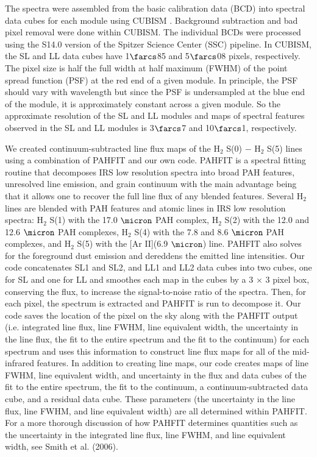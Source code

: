 \documentclass[12pt,preprint]{aastex}
\begin{document}
The spectra were assembled from the basic calibration data (BCD) into
spectral data cubes for each module using CUBISM \citep{ken03, smi04, smi07b}.
Background subtraction and bad pixel removal were done within CUBISM.
The individual BCDs were processed using the S14.0 version of
the Spitzer Science Center (SSC) pipeline.  In CUBISM, the SL and LL
data cubes have 1$\farcs$85 and 5$\farcs$08 pixels,
respectively.  The pixel size is half the full width at half 
maximum (FWHM) of the point spread function (PSF)
at the red end of a given module.  In principle, the PSF should 
vary with wavelength but since the PSF is
undersampled at the blue end of the module, it is approximately
constant across a given module.  So the approximate resolution of the
SL and LL modules and maps of spectral features observed 
in the SL and LL modules is 3$\farcs$7 and 10$\farcs$1, respectively.

We created continuum-subtracted line flux maps of the H$_2$
S(0) $-$ H$_2$ S(5) lines using a combination of PAHFIT
\citep{smi07} and our own code.  PAHFIT is a spectral fitting routine
that decomposes IRS low resolution spectra into broad 
PAH features, unresolved line emission, and grain continuum with the main advantage
being that it allows one to recover the full line flux of any blended
features.  Several H$_2$ lines are blended with PAH features and atomic 
lines in IRS low resolution spectra:
H$_2$ S(1) with the 17.0 $\micron$ PAH complex,
H$_2$ S(2) with the 12.0 and 12.6 $\micron$ PAH complexes, 
H$_2$ S(4) with the 7.8 and 8.6 $\micron$ PAH complexes, and 
H$_2$ S(5) with the [Ar II](6.9 $\micron$) line.  
PAHFIT also solves for the foreground dust emission and 
dereddens the emitted line intensities.  Our code
concatenates SL1 and SL2, and LL1 and LL2 data cubes into two cubes,
one for SL and one for LL and smoothes each map in the cubes by a 3
$\times$ 3 pixel box, conserving the flux, to increase the
signal-to-noise ratio of the spectra.  Then, for each pixel,
the spectrum is extracted and PAHFIT is run to decompose it.  Our code saves the
location of the pixel on the sky along with the PAHFIT output 
(i.e. integrated line flux, line FWHM, line equivalent width, the 
uncertainty in the line flux, the fit to the entire spectrum and 
the fit to the continuum) for each spectrum and uses this 
information to construct line flux maps for all of the mid-infrared 
features.  In addition to creating line maps, our code creates maps 
of line FWHM, line equivalent width, and uncertainty in the 
flux and data cubes of the fit to the entire spectrum, the fit to 
the continuum, a continuum-subtracted data cube, and a 
residual data cube.  These parameters (the uncertainty in 
the line flux, line FWHM, and line equivalent width) are all determined 
within PAHFIT.  For a more thorough discussion of how 
PAHFIT determines quantities such as the uncertainty 
in the integrated line flux, line FWHM, and line 
equivalent width, see Smith et al. (2006). 
\end{document}

